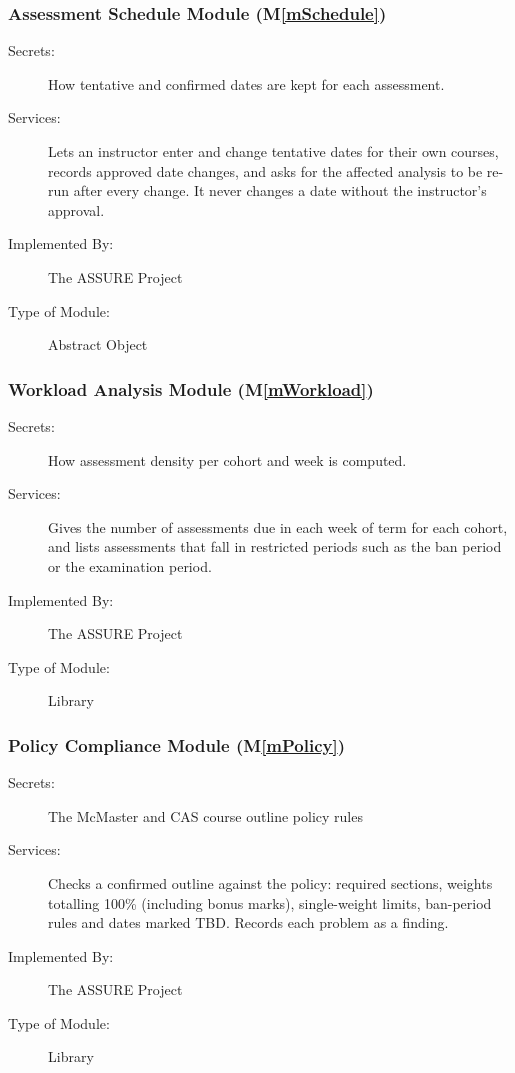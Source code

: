 \documentclass[12pt, titlepage]{article}
\newcommand{\sysname}{The ASSURE Project}
\newcommand{\mref}[1]{M\ref{#1}}
\begin{document}
\subsubsection{Assessment Schedule Module (\mref{mSchedule})} \label{SecMD-mSchedule}

\begin{description}
\item[Secrets:] How tentative and confirmed dates are kept for each assessment.
\item[Services:] Lets an instructor enter and change tentative dates for their
  own courses, records approved date changes, and asks for the affected
  analysis to be re-run after every change. It never changes a date without the
  instructor's approval.
\item[Implemented By:] \sysname
\item[Type of Module:] Abstract Object
\end{description}

\subsubsection{Workload Analysis Module (\mref{mWorkload})} \label{SecMD-mWorkload}

\begin{description}
\item[Secrets:] How assessment density per cohort and week is computed.
\item[Services:] Gives the number of assessments due in each week of term for each cohort, and
lists assessments that fall in restricted periods such as the ban period or the examination period.
\item[Implemented By:] \sysname
\item[Type of Module:] Library
\end{description}

\subsubsection{Policy Compliance Module (\mref{mPolicy})}

\begin{description}
\item[Secrets:] The McMaster and CAS course outline policy rules
\item[Services:] Checks a confirmed outline against the policy: required sections, weights totalling
100\% (including bonus marks), single-weight limits, ban-period rules and dates marked
TBD. Records each problem as a finding.
\item[Implemented By:] \sysname
\item[Type of Module:] Library
\end{description}
\end{document}
